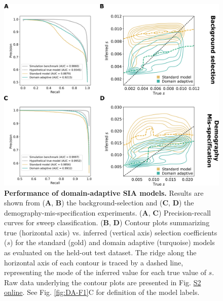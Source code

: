 \begin{figure}
    \centering
    \includegraphics[width=\textwidth]{DA_figs/DA_F3.PNG}
    \caption[Performance of domain-adaptive \ac{SIA} models.]{\textbf{Performance of domain-adaptive \ac{SIA} models.} Results are shown from (\textbf{A}, \textbf{B}) the background-selection and (\textbf{C}, \textbf{D}) the demography-mis-specification experiments. (\textbf{A}, \textbf{C}) Precision-recall curves for sweep classification. (\textbf{B}, \textbf{D}) Contour plots summarizing true (horizontal axis) vs. inferred (vertical axis) selection coefficients ($s$) for the standard (gold) and domain adaptive (turquoise) models as evaluated on the held-out test dataset. The ridge along the horizontal axis of each contour is traced by a dashed line, representing the mode of the inferred value for each true value of $s$. Raw data underlying the contour plots are presented in Fig. \href{https://journals.plos.org/plosgenetics/article?id=10.1371/journal.pgen.1011032\#sec018}{S2 online}. See Fig. \ref{fig:DA-F1}C for definition of the model labels.}
    \label{fig:DA-F3}
\end{figure}

